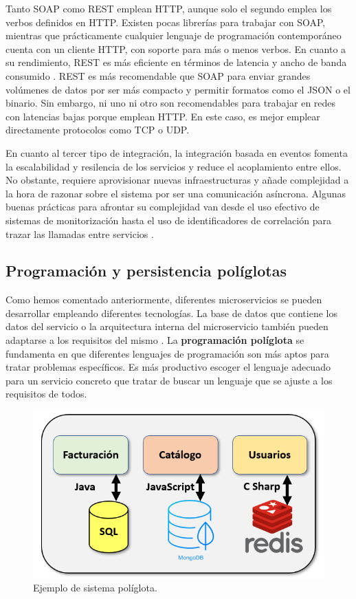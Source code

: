 \documentclass[11pt,spanish,listoffigures]{tfgetsinf}
\begin{document}
Tanto SOAP como REST emplean HTTP, aunque solo el segundo emplea los verbos definidos en HTTP. Existen pocas librerías para trabajar con SOAP, mientras que prácticamente cualquier lenguaje de programación contemporáneo cuenta con un cliente HTTP, con soporte para más o menos verbos. En cuanto a su rendimiento, REST es más eficiente en términos de latencia y ancho de banda consumido \cite{Mulligan}. REST es más recomendable que SOAP para enviar grandes volúmenes de datos por ser más compacto y permitir formatos como el JSON o el binario. Sin embargo, ni uno ni otro son recomendables para trabajar en redes con latencias bajas porque emplean HTTP. En este caso, es mejor emplear directamente protocolos como TCP o UDP. 

En cuanto al tercer tipo de integración, la integración basada en eventos fomenta la escalabilidad y resilencia de los servicios y reduce el acoplamiento entre ellos. No obstante, requiere aprovisionar nuevas infraestructuras y añade complejidad a la hora de razonar sobre el sistema por ser una comunicación asíncrona. Algunas buenas prácticas para afrontar su complejidad van desde el uso efectivo de sistemas de monitorización hasta el uso de identificadores de correlación para trazar las llamadas entre servicios \cite{Newman2015a}. 

\subsection{Programación y persistencia políglotas} \label{subsec:Poliglota}

Como hemos comentado anteriormente, diferentes microservicios se pueden desarrollar empleando diferentes tecnologías. La base de datos que contiene los datos del servicio o la arquitectura interna del microservicio también pueden adaptarse a los requisitos del mismo \cite{DelaTorre2018}. La \textbf{programación políglota} se fundamenta en que diferentes lenguajes de programación son más aptos para tratar problemas específicos. Es más productivo escoger el lenguaje adecuado para un servicio concreto que tratar de buscar un lenguaje que se ajuste a los requisitos de todos.

\begin{figure}[h]
\centering
\includegraphics[scale=0.65]{poliglota}
\caption{Ejemplo de sistema políglota.}
\end{figure}
\end{document}
